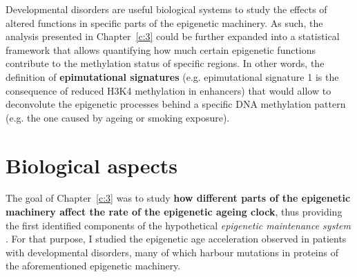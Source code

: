 \bigskip

Developmental disorders are useful biological systems to study the effects of altered functions in specific parts of the epigenetic machinery. As such, the analysis presented in Chapter~\ref{c:3} could be further expanded into a statistical framework that allows quantifying how much certain epigenetic functions contribute to the methylation status of specific regions. In other words, the definition of \textbf{epimutational signatures} (e.g. epimutational signature 1 is the consequence of reduced H3K4 methylation in enhancers) that would allow to deconvolute the epigenetic processes behind a specific DNA methylation pattern (e.g. the one caused by ageing or smoking exposure).

\smallskip

\section{Biological aspects}

\smallskip

The goal of Chapter~\ref{c:3} was to study \textbf{how different parts of the epigenetic machinery affect the rate of the epigenetic ageing clock}, thus providing the first identified components of the hypothetical \textit{epigenetic maintenance system} \citep{Horvath2013}. For that purpose, I studied the epigenetic age acceleration observed in patients with developmental disorders, many of which harbour mutations in proteins of the aforementioned epigenetic machinery.

\bigskip

